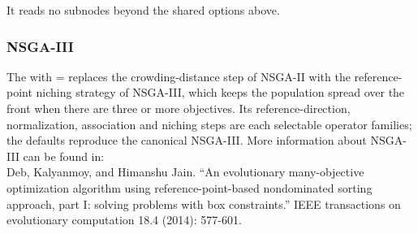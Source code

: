   It reads no subnodes beyond the shared options above.


\subsubsection{NSGA-III}
  The  with =
  replaces the crowding-distance step of NSGA-II with the reference-point niching
  strategy of NSGA-III, which keeps the population spread over the front when there
  are three or more objectives. Its reference-direction, normalization, association
  and niching steps are each selectable operator families; the defaults reproduce the
  canonical NSGA-III. More information about NSGA-III can be found in:\\
  Deb, Kalyanmoy, and Himanshu Jain. ``An evolutionary many-objective optimization
  algorithm using reference-point-based nondominated sorting approach, part I: solving
  problems with box constraints.'' IEEE transactions on evolutionary computation 18.4
  (2014): 577-601.

